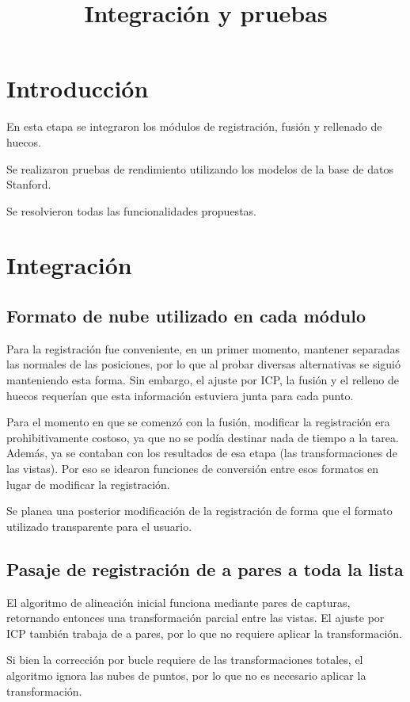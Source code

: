 \documentclass{pfc}
\title{Integración y pruebas}
\begin{document}
	\maketitle
	\section{Introducción}

	En esta etapa se integraron los módulos de registración, fusión y rellenado de huecos.

	Se realizaron pruebas de rendimiento utilizando los modelos de la base de datos Stanford.

	Se resolvieron todas las funcionalidades propuestas.

	\section{Integración}
	\subsection{Formato de nube utilizado en cada módulo}
		Para la registración fue conveniente, en un primer momento, mantener
		separadas las normales de las posiciones, por lo que al probar diversas
		alternativas se siguió manteniendo esta forma.
		Sin embargo, el ajuste por ICP, la fusión y el relleno de huecos
		requerían que esta información estuviera junta para cada punto.

		Para el momento en que se comenzó con la fusión, modificar la
		registración era prohibitivamente costoso, ya que no se podía destinar nada de tiempo a la tarea.
		Además, ya se contaban con los resultados de esa etapa (las transformaciones de las vistas).
		Por eso se idearon funciones de conversión entre esos formatos en lugar de modificar la registración.

		Se planea una posterior modificación de la registración de forma que el
		formato utilizado transparente para el usuario.

	
	\subsection{Pasaje de registración de a pares a toda la lista}
		El algoritmo de alineación inicial funciona mediante pares de capturas,
		retornando entonces una transformación parcial entre las vistas.
		El ajuste por ICP también trabaja de a pares, por lo que no requiere aplicar la transformación.

		Si bien la corrección por bucle requiere de las transformaciones
		totales, el algoritmo ignora las nubes de puntos, por lo que no es
		necesario aplicar la transformación.
\end{document}
